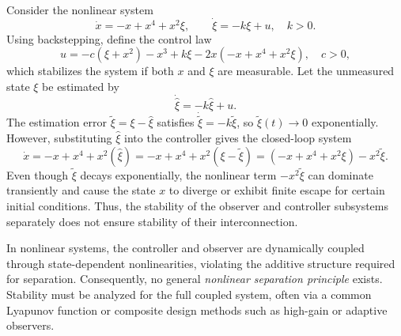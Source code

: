 \begin{example}
Consider the nonlinear system
\[
\dot{x} = -x + x^4 + x^2 \xi, \qquad \dot{\xi} = -k\xi + u, \quad k > 0.
\]
Using backstepping, define the control law
\[
u = -c(\xi + x^2) - x^3 + k\xi - 2x(-x + x^4 + x^2\xi), \quad c > 0,
\]
which stabilizes the system if both \(x\) and \(\xi\) are measurable.
Let the unmeasured state \(\xi\) be estimated by
\[
\dot{\hat{\xi}} = -k\hat{\xi} + u.
\]
The estimation error \(\tilde{\xi} = \xi - \hat{\xi}\) satisfies \(\dot{\tilde{\xi}} = -k\tilde{\xi}\),
so \(\tilde{\xi}(t) \to 0\) exponentially.
However, substituting \(\hat{\xi}\) into the controller gives the closed-loop system
\[
\dot{x} = -x + x^4 + x^2(\hat{\xi})
         = -x + x^4 + x^2(\xi - \tilde{\xi})
         = (-x + x^4 + x^2\xi) - x^2\tilde{\xi}.
\]
Even though \(\tilde{\xi}\) decays exponentially, the nonlinear term \(-x^2\tilde{\xi}\)
can dominate transiently and cause the state \(x\) to diverge or exhibit finite escape
for certain initial conditions.
Thus, the stability of the observer and controller subsystems separately
does not ensure stability of their interconnection.
\end{example}

\begin{remark}
In nonlinear systems, the controller and observer are dynamically coupled through
state-dependent nonlinearities, violating the additive structure required for separation.
Consequently, no general \emph{nonlinear separation principle} exists.
Stability must be analyzed for the full coupled system, often via a common Lyapunov function
or composite design methods such as high-gain or adaptive observers.
\end{remark}
